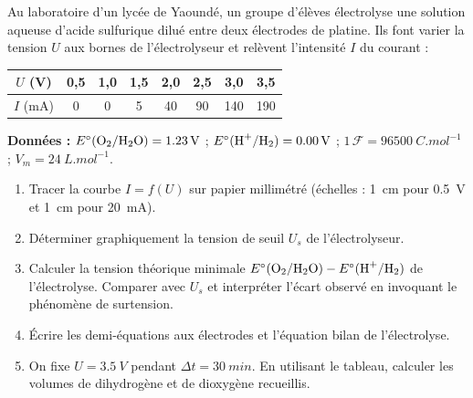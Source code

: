 \documentclass[11pt]{article}
\begin{document}
\begin{exercice}
Au laboratoire d'un lycée de Yaoundé, un groupe d'élèves électrolyse une solution aqueuse d'acide sulfurique dilué entre deux électrodes de platine. Ils font varier la tension $U$ aux bornes de l'électrolyseur et relèvent l'intensité $I$ du courant :

\begin{center}
\begin{tabular}{|c|c|c|c|c|c|c|c|}
\hline
$U$ (V) & 0,5 & 1,0 & 1,5 & 2,0 & 2,5 & 3,0 & 3,5 \\
\hline
$I$ (mA) & 0 & 0 & 5 & 40 & 90 & 140 & 190 \\
\hline
\end{tabular}
\end{center}

\textbf{Données :} $E^\circ(\ce{O2}/\ce{H2O}) = \SI{1,23}{V}$ ; $E^\circ(\ce{H+}/\ce{H2}) = \SI{0,00}{V}$ ; $1\,\mathcal{F} = \SI{96500}{C.mol^{-1}}$ ; $V_m = \SI{24}{L.mol^{-1}}$.

\begin{enumerate}
\item Tracer la courbe $I = f(U)$ sur papier millimétré (échelles : \SI{1}{cm} pour \SI{0,5}{V} et \SI{1}{cm} pour \SI{20}{mA}).
\item Déterminer graphiquement la tension de seuil $U_s$ de l'électrolyseur.
\item Calculer la tension théorique minimale $E^\circ(\ce{O2}/\ce{H2O}) - E^\circ(\ce{H+}/\ce{H2})$ de l'électrolyse. Comparer avec $U_s$ et interpréter l'écart observé en invoquant le phénomène de surtension.
\item Écrire les demi-équations aux électrodes et l'équation bilan de l'électrolyse.
\item On fixe $U = \SI{3,5}{V}$ pendant $\Delta t = \SI{30}{min}$. En utilisant le tableau, calculer les volumes de dihydrogène et de dioxygène recueillis.
\end{enumerate}
\end{exercice}
\end{document}
